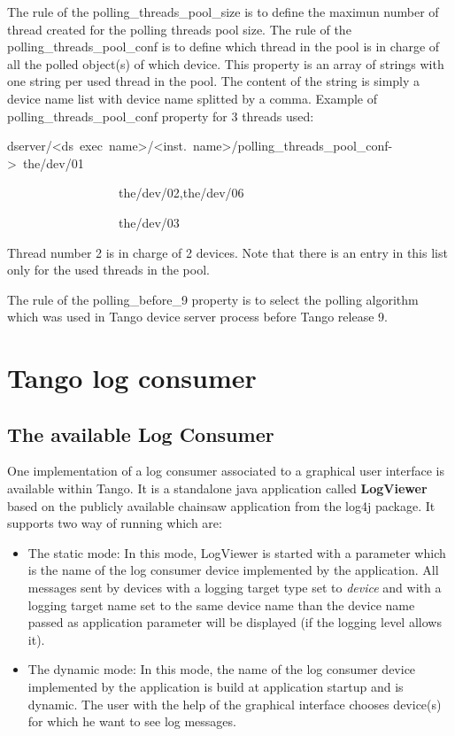 \vspace{0.3cm}

The rule of the polling\_threads\_pool\_size
is to define the maximun number of thread created for the polling
threads pool size. The rule of the polling\_threads\_pool\_conf
is to define which thread in the pool is in charge of all the polled
object(s) of which device. This property is an array of strings with
one string per used thread in the pool. The content of the string
is simply a device name list with device name splitted by a comma.
Example of polling\_threads\_pool\_conf property for 3 threads used:
\begin{lyxcode}
dserver/<ds~exec~name>/<inst.~name>/polling\_threads\_pool\_conf->~the/dev/01

~~~~~~~~~~~~~~~~~~the/dev/02,the/dev/06

~~~~~~~~~~~~~~~~~~the/dev/03
\end{lyxcode}
Thread number 2 is in charge of 2 devices. Note that there is an entry
in this list only for the used threads in the pool.

The rule of the polling\_before\_9
property is to select the polling algorithm which was used in Tango
device server process before Tango release 9.

\section{Tango log consumer \label{sec:Tango-log-consumer}}

\subsection{The available Log Consumer}

One implementation of a log consumer associated to a graphical user
interface is available within Tango. It is a standalone java application
called \textbf{LogViewer} based on the publicly available chainsaw
application from the log4j package. It supports two way of running
which are:
\begin{itemize}
\item The static mode: In this mode, LogViewer is started with a parameter
which is the name of the log consumer device implemented by the application.
All messages sent by devices with a logging target type set to \emph{device}
and with a logging target name set to the same device name than the
device name passed as application parameter will be displayed (if
the logging level allows it).
\item The dynamic mode: In this mode, the name of the log consumer device
implemented by the application is build at application startup and
is dynamic. The user with the help of the graphical interface chooses
device(s) for which he want to see log messages.
\end{itemize}

